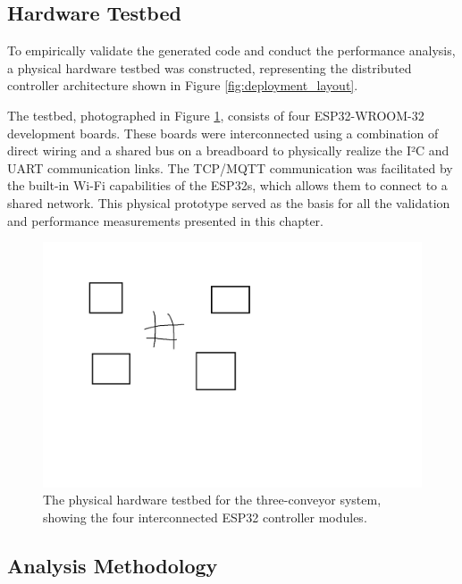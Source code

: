 \subsection{Hardware Testbed}
\label{subsec:hardware_setup}

To empirically validate the generated code and conduct the performance analysis, a physical hardware testbed was constructed, representing the distributed controller architecture shown in Figure \ref{fig:deployment_layout}. 

The testbed, photographed in Figure \ref{fig:hardware_photo}, consists of four ESP32-WROOM-32 development boards. These boards were interconnected using a combination of direct wiring and a shared bus on a breadboard to physically realize the I²C and UART communication links. The TCP/MQTT communication was facilitated by the built-in Wi-Fi capabilities of the ESP32s, which allows them to connect to a shared network. This physical prototype served as the basis for all the validation and performance measurements presented in this chapter.

\begin{figure}[htb!]
    \centering
    \includegraphics[width=0.9\columnwidth]{Chapters/Figures/photo_of_setup.png}
    \caption{The physical hardware testbed for the three-conveyor system, showing the four interconnected ESP32 controller modules.}
    \label{fig:hardware_photo}
\end{figure}


\subsection{Analysis Methodology}
\label{subsec:analysis_methodology}

